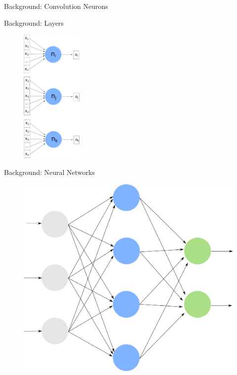 \documentclass[xcolor=dvipsnames]{beamer}
\begin{document}
\begin{frame}{Background: Convolution Neurons}
\centering
{}
\end{frame}

\begin{frame}{Background: Layers}

\begin{figure}
    \includegraphics[width=3cm]{images/layer.pdf}
\end{figure}

\end{frame}


\begin{frame}{Background: Neural Networks}

\begin{figure}
    \centering
    \includegraphics[width=0.6\linewidth]{images/neural_network.pdf}
\end{figure}
\end{frame}
\end{document}
